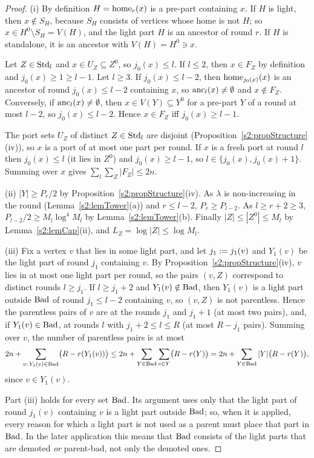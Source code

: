 \begin{proof}
(i) By definition $H=\mathrm{home}_r(x)$ is a pre-part containing $x$. If $H$ is light,
then $x\notin S_H$, because $S_H$ consists of vertices whose home is not $H$;
so $x\in H^0\setminus S_H=V(H)$, and the light part $H$ is an ancestor of round
$r$. If $H$ is standalone, it is an ancestor with $V(H)=H^0\ni x$.

Let $Z\in\mathrm{Std}_l$ and $x\in U_Z\subseteq Z^0$, so $j_0(x)\le l$. If $l\le2$,
then $x\in F_Z$ by definition and $j_0(x)\ge1\ge l-1$. Let $l\ge3$. If
$j_0(x)\le l-2$, then $\mathrm{home}_{j_0(x)}(x)$ is an ancestor of round $j_0(x)\le
l-2$ containing $x$, so $\mathrm{anc}_l(x)\ne\emptyset$ and $x\notin F_Z$. Conversely,
if $\mathrm{anc}_l(x)\ne\emptyset$, then $x\in V(Y)\subseteq Y^0$ for a pre-part $Y$ of
a round at most $l-2$, so $j_0(x)\le l-2$. Hence $x\in F_Z$ iff $j_0(x)\ge
l-1$.

The port sets $U_Z$ of distinct $Z\in\mathrm{Std}_l$ are disjoint
(Proposition~\ref{s2:propStructure}(iv)), so $x$ is a port of at most one part
per round. If $x$ is a fresh port at round $l$ then $j_0(x)\le l$ (it lies in
$Z^0$) and $j_0(x)\ge l-1$, so $l\in\{j_0(x),j_0(x)+1\}$. Summing over $x$
gives $\sum_l\sum_Z|F_Z|\le2n$.

(ii) $|Y|\ge P_r/2$ by Proposition~\ref{s2:propStructure}(iv). As $\lambda$ is
non-increasing in the round (Lemma~\ref{s2:lemTower}(a)) and $r\le l-2$,
$P_r\ge P_{l-2}$. As $l\ge r+2\ge3$, $P_{l-2}/2\ge M_l\log^4M_l$ by
Lemma~\ref{s2:lemTower}(b). Finally $|Z|\le|Z^0|\le M_l$ by
Lemma~\ref{s2:lemCap}(ii), and $L_Z=\log|Z|\le\log M_l$.

(iii) Fix a vertex $v$ that lies in some light part, and let $j_1\mathrel{:=}
j_1(v)$ and $Y_1(v)$ be the light part of round $j_1$ containing $v$. By
Proposition~\ref{s2:propStructure}(iv), $v$ lies in at most one light part per
round, so the pairs $(v,Z)$ correspond to distinct rounds $l\ge j_1$. If $l\ge
j_1+2$ and $Y_1(v)\notin\mathrm{Bad}$, then $Y_1(v)$ is a light part outside $\mathrm{Bad}$ of
round $j_1\le l-2$ containing $v$, so $(v,Z)$ is not parentless. Hence the
parentless pairs of $v$ are at the rounds $j_1$ and $j_1+1$ (at most two
pairs), and, if $Y_1(v)\in\mathrm{Bad}$, at rounds $l$ with $j_1+2\le l\le R$ (at most
$R-j_1$ pairs). Summing over $v$, the number of parentless pairs is at most
\[
2n+\sum_{v:\,Y_1(v)\in\mathrm{Bad}}\bigl(R-r(Y_1(v))\bigr)\le2n+\sum_{Y\in\mathrm{Bad}}
\sum_{v\in Y}\bigl(R-r(Y)\bigr)=2n+\sum_{Y\in\mathrm{Bad}}|Y|\bigl(R-r(Y)\bigr),
\]
since $v\in Y_1(v)$.

Part (iii) holds for every set $\mathrm{Bad}$. Its argument uses only that the light
part of round $j_1(v)$ containing $v$ is a light part outside $\mathrm{Bad}$; so, when
it is applied, every reason for which a light part is not used as a parent must
place that part in $\mathrm{Bad}$. In the later application this means that $\mathrm{Bad}$
consists of the light parts that are demoted \emph{or} parent-bad, not only the
demoted ones.
\end{proof}

